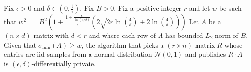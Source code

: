 Fix $\epsilon > 0$ and $\delta \in \left(0,\frac{1}{e}\right)$. Fix $B>0$. Fix a positive integer $r$ and let $w$ be such that $w^2 \;=\; B^2\left(1 + \frac{1 + \frac{\epsilon}{\ln(4/\delta)}}{\epsilon}\left(2\sqrt{2r\ln\!\left(\frac{4}{\delta}\right)} + 2\ln\!\left(\frac{4}{\delta}\right)\right)\right)$ Let $A$ be a $(n\times d)$-matrix with $d<r$ and where each row of $A$ has bounded $L_2$-norm of $B$. Given that $\sigma_{\min}(A)\ge w$, the algorithm that picks a $(r\times n)$-matrix $R$ whose entries are iid samples from a normal distribution $\mathcal{N}(0,1)$ and publishes $R\cdot A$ is $(\epsilon,\delta)$-differentially private.